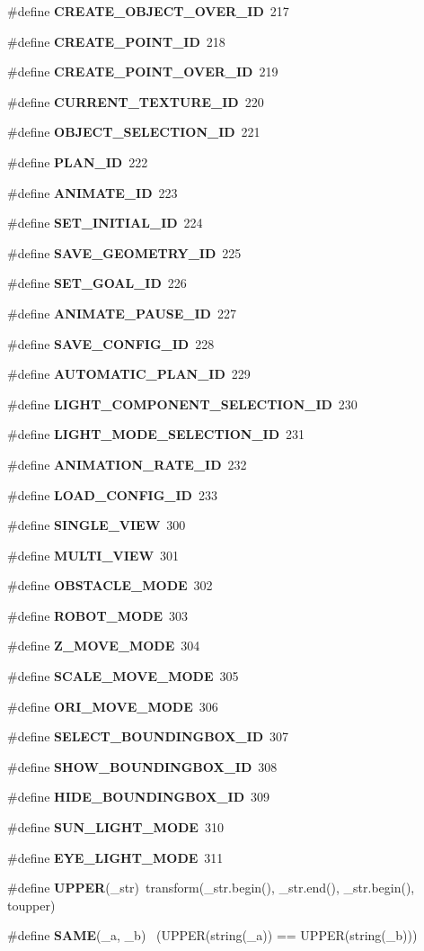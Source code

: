 \begin{CompactItemize}
\item 
\#define {\bf CREATE\_\-OBJECT\_\-OVER\_\-ID}\ 217
\item 
\#define {\bf CREATE\_\-POINT\_\-ID}\ 218
\item 
\#define {\bf CREATE\_\-POINT\_\-OVER\_\-ID}\ 219
\item 
\#define {\bf CURRENT\_\-TEXTURE\_\-ID}\ 220
\item 
\#define {\bf OBJECT\_\-SELECTION\_\-ID}\ 221
\item 
\#define {\bf PLAN\_\-ID}\ 222
\item 
\#define {\bf ANIMATE\_\-ID}\ 223
\item 
\#define {\bf SET\_\-INITIAL\_\-ID}\ 224
\item 
\#define {\bf SAVE\_\-GEOMETRY\_\-ID}\ 225
\item 
\#define {\bf SET\_\-GOAL\_\-ID}\ 226
\item 
\#define {\bf ANIMATE\_\-PAUSE\_\-ID}\ 227
\item 
\#define {\bf SAVE\_\-CONFIG\_\-ID}\ 228
\item 
\#define {\bf AUTOMATIC\_\-PLAN\_\-ID}\ 229
\item 
\#define {\bf LIGHT\_\-COMPONENT\_\-SELECTION\_\-ID}\ 230
\item 
\#define {\bf LIGHT\_\-MODE\_\-SELECTION\_\-ID}\ 231
\item 
\#define {\bf ANIMATION\_\-RATE\_\-ID}\ 232
\item 
\#define {\bf LOAD\_\-CONFIG\_\-ID}\ 233
\item 
\#define {\bf SINGLE\_\-VIEW}\ 300
\item 
\#define {\bf MULTI\_\-VIEW}\ 301
\item 
\#define {\bf OBSTACLE\_\-MODE}\ 302
\item 
\#define {\bf ROBOT\_\-MODE}\ 303
\item 
\#define {\bf Z\_\-MOVE\_\-MODE}\ 304
\item 
\#define {\bf SCALE\_\-MOVE\_\-MODE}\ 305
\item 
\#define {\bf ORI\_\-MOVE\_\-MODE}\ 306
\item 
\#define {\bf SELECT\_\-BOUNDINGBOX\_\-ID}\ 307
\item 
\#define {\bf SHOW\_\-BOUNDINGBOX\_\-ID}\ 308
\item 
\#define {\bf HIDE\_\-BOUNDINGBOX\_\-ID}\ 309
\item 
\#define {\bf SUN\_\-LIGHT\_\-MODE}\ 310
\item 
\#define {\bf EYE\_\-LIGHT\_\-MODE}\ 311
\item 
\#define {\bf UPPER}(\_\-str)\ transform(\_\-str.begin(), \_\-str.end(), \_\-str.begin(), toupper)
\item 
\#define {\bf SAME}(\_\-a, \_\-b)	\ (UPPER(string(\_\-a)) == UPPER(string(\_\-b)))
\end{CompactItemize}
